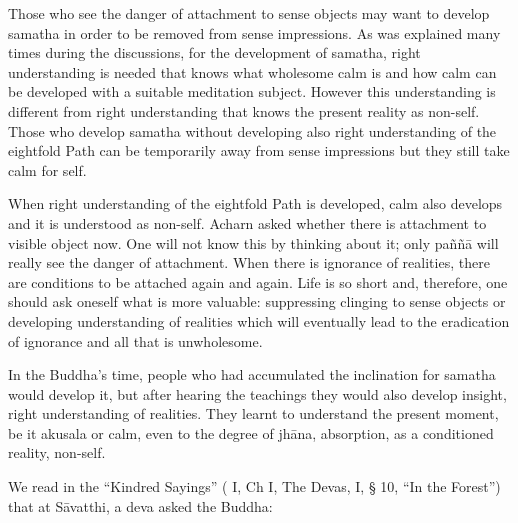Those who see the danger of attachment to sense objects may want to
develop samatha in order to be removed from sense impressions. As was
explained many times during the discussions, for the development of
samatha, right understanding is needed that knows what wholesome calm is
and how calm can be developed with a suitable meditation subject.
However this understanding is different from right understanding that
knows the present reality as non-self. Those who develop samatha without
developing also right understanding of the eightfold Path can be
temporarily away from sense impressions but they still take calm for
self.

When right understanding of the eightfold Path is developed, calm also
develops and it is understood as non-self. Acharn asked whether there is
attachment to visible object now. One will not know this by thinking
about it; only paññā will really see the danger of attachment. When
there is ignorance of realities, there are conditions to be attached
again and again. Life is so short and, therefore, one should ask oneself
what is more valuable: suppressing clinging to sense objects or
developing understanding of realities which will eventually lead to the
eradication of ignorance and all that is unwholesome.

In the Buddha's time, people who had accumulated the inclination for
samatha would develop it, but after hearing the teachings they would
also develop insight, right understanding of realities. They learnt to
understand the present moment, be it akusala or calm, even to the degree
of jhāna, absorption, as a conditioned reality, non-self.

We read in the ``Kindred Sayings'' ( I, Ch I, The Devas, I, § 10, ``In
the Forest'') that at Sāvatthi, a deva asked the Buddha:

